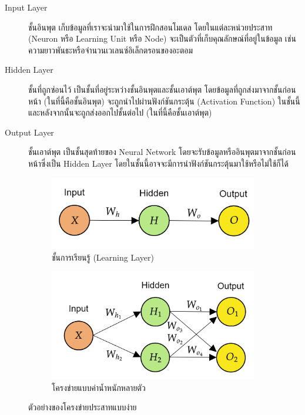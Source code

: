 \begin{description}
    \item[Input Layer] ชั้นอินพุต เก็บข้อมูลที่เราจะนำมาใช้ในการฝึกสอนโมเดล โดยในแต่ละหน่วยประสาท (Neuron หรือ Learning Unit
        หรือ Node) จะเป็นตัวที่เก็บคุณลักษณ์ที่อยู่ในข้อมูล เช่น ความยาวพันธะหรือจำนวนเวเลนซ์อิเล็กตรอนของอะตอม

    \item[Hidden Layer] ชั้นที่ถูกซ่อนไว้ เป็นชั้นที่อยู่ระหว่างชั้นอินพุตและชั้นเอาต์พุต โดยข้อมูลที่ถูกส่งมาจากชั้นก่อนหน้า (ในที่นี้คือชั้นอินพุต)
        จะถูกนำไปผ่านฟังก์ชันกระตุ้น (Activation Function) ในชั้นนี้ และหลังจากนั้นจะถูกส่งออกไปชั้นต่อไป (ในที่นี้คือชั้นเอาต์พุต)

    \item[Output Layer] ชั้นเอาต์พุต เป็นชั้นสุดท้ายของ Neural Network โดยจะรับข้อมูลหรืออินพุตมาจากชั้นก่อนหน้าซึ่งเป็น Hidden
        Layer โดยในชั้นนี้อาจจะมีการนำฟังก์ชันกระตุ้นมาใช้หรือไม่ใช้ก็ได้
\end{description}

\begin{figure}[H]
    \centering
    \begin{subfigure}{0.5\textwidth}
        \centering
        \includegraphics[width=0.9\linewidth]{fig/nn_layer.png}
        \caption{ชั้นการเรียนรู้ (Learning Layer)}
        \label{fig:nn_layer}
    \end{subfigure}%
    \begin{subfigure}{0.5\textwidth}
        \centering
        \includegraphics[width=0.9\linewidth]{fig/nn_w_matrices.png}
        \caption{โครงข่ายแบบค่าน้ำหนักหลายตัว}
        \label{fig:nn_w_matrices}
    \end{subfigure}
    \caption{ตัวอย่างของโครงข่ายประสาทแบบง่าย}
    \label{fig:nn_layer_w}
\end{figure}

